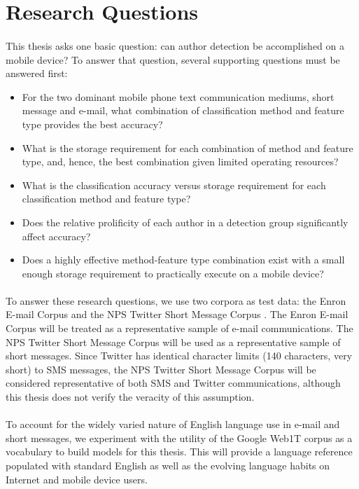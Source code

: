 \section{Research Questions}
\paragraph*{} This thesis asks one basic question: can author detection be accomplished on a mobile device?  To answer that question, several supporting questions must be answered first: 
\begin{itemize}
	\item For the two dominant mobile phone text communication mediums, short message and e-mail, what combination of classification method and feature type provides the best accuracy?
	\item What is the storage requirement for each combination of method and feature type, and, hence, the best combination given limited operating resources?
	\item What is the classification accuracy versus storage requirement for each classification method and feature type?
	\item Does the relative prolificity of each author in a detection group significantly affect accuracy?
	\item Does a highly effective method-feature type combination exist with a small enough storage requirement to practically execute on a mobile device?
\end{itemize}

\paragraph*{} To answer these research questions, we use two corpora as test data: the Enron E-mail Corpus \cite{brants_web_2006} and the NPS Twitter Short Message Corpus \cite{boutwell_sarah_author_2011}.  The Enron E-mail Corpus will be treated as a representative sample of e-mail communications.  The NPS Twitter Short Message Corpus will be used as a representative sample of short messages.  Since Twitter has identical character limits (140 characters, very short) to SMS messages, the NPS Twitter Short Message Corpus will be considered representative of both SMS and Twitter communications, although this thesis does not verify the veracity of this assumption.

\paragraph*{} To account for the widely varied nature of English language use in e-mail and short messages, we experiment with the utility of the Google Web1T corpus \cite{brants_web_2006} as a vocabulary to build models for this thesis.  This will provide a language reference populated with standard English as well as the evolving language habits on Internet and mobile device users.



